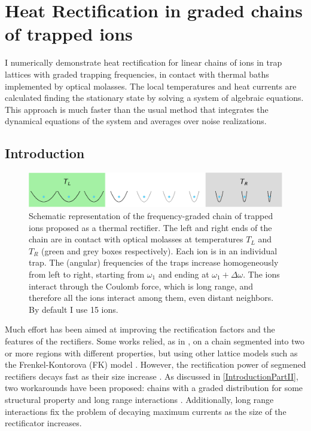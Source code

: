 
\chapter{Heat Rectification in graded chains of trapped ions}
\label{Chapter5}
%
I numerically demonstrate heat rectification for linear chains of  ions in trap lattices with  graded  trapping frequencies, in contact with
thermal baths implemented by optical molasses.  The local temperatures and heat currents are calculated finding the stationary state by solving a system of algebraic equations. This approach is much faster than the usual method that integrates the dynamical equations of the system and averages over noise realizations.
%
\newpage
%
\section{Introduction\label{IntroductionRectificationChainOfIons}}

\begin{figure}
    \center
    \includegraphics[width=0.75\linewidth]{Figures/Diagram.eps}
    \caption{Schematic representation  of the frequency-graded chain of trapped ions proposed as a thermal rectifier. The left and right ends of the chain are in contact with optical molasses at temperatures $T_L$ and $T_R$ (green and grey boxes respectively). Each ion is in an individual trap. The (angular) frequencies of the traps increase homogeneously from left to right, starting from $\omega_1$ and ending at $\omega_1+\Delta\omega$. The ions interact through the Coulomb force, which is long range, and therefore all the ions interact among them, even distant neighbors. By default  I use 15 ions.}
    \label{fig:Diagram}
\end{figure}

Much effort has been aimed at improving the rectification factors and the features of the rectifiers. Some works
relied, as in \cite{Terraneo2002}, on a chain segmented into two or more regions  with different properties,  but using other lattice models such as the Frenkel-Kontorova (FK) model \cite{Li2008,Hu2006}. However, the rectification power of segmened rectifiers decays fast as their size increase \cite{Hu2006}. As discussed in \ref{IntroductionPartII}, two workarounds have been proposed: chains with a graded distribution for some structural property \cite{Wang2012,Chen2015,Romero-Bastida2017,Yang2007,Romero-Bastida2013,Dettori2016,Pereira2010,Pereira2011,Avila2013} and long range interactions \cite{Chen2015,Bagchi2017,Pereira2013}. Additionally, long range interactions fix the problem of decaying maximum currents as the size of the rectificator increases.

